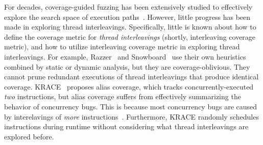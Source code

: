 

For decades, coverage-guided fuzzing has been extensively studied to
effectively explore the search space of execution paths~\cite{janus,
  hydra, healer, imf, hfl, syzkaller, klee, s2e, kafl}.
%
However, little progress has been made in exploring thread
interleavings.
%
Specifically, little is known about how to define the coverage metric
for \textit{thread interleavings} (shortly, interleaving coverage
metric), and how to utilize interleaving coverage metric in exploring
thread interleavings.
%
For example, Razzer~\cite{razzer} and Snowboard~\cite{snowboard} use
their own heuristics combined by static or dynamic analysis, but they
are coverage-oblivious.  They cannot prune redundant executions of
thread interleavings that produce identical coverage.
%
KRACE~\cite{krace} proposes alias coverage, which tracks
concurrently-executed \textit{two} instructions, but alias coverage
suffers from effectively summarizing the behavior of concurrency bugs.
This is because most concurrency bugs are caused by interelavings of
\textit{more} instructions~\cite{learningfrommistakes}.  Furthermore,
KRACE randomly schedules instructions during runtime without
considering what thread interleavings are explored before.

